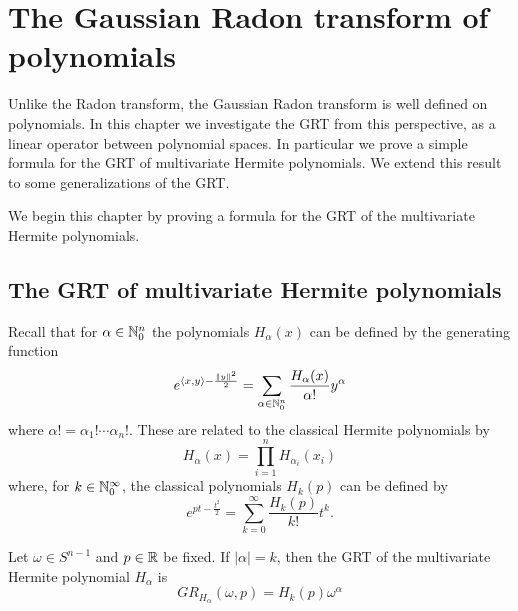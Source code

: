 \chapter{The Gaussian Radon transform of polynomials}{}
\label{chap:GRTpoly}

Unlike the Radon transform, the Gaussian Radon transform is well defined on polynomials. In this chapter we investigate the GRT from this perspective, as a linear operator between polynomial spaces. In particular we prove a simple formula for the GRT of multivariate Hermite polynomials. We extend this result to some generalizations of the GRT.

We begin this chapter by proving a formula for the GRT of the multivariate Hermite polynomials.

\section{The GRT of multivariate Hermite polynomials}


Recall that for $\alpha \in \mathbb{N}_0^n$ the polynomials $H_\alpha(x)$ can be defined by the generating function
\[
  e^{\langle x, y\rangle - \frac{\|y\|^2}2} = \sum_{\alpha \in \mathbb{N}_0^n} \frac{H_\alpha(x)}{\alpha!} y^\alpha
\]
where $\alpha! = \alpha_1! \cdots \alpha_n!$. These are related to the classical Hermite polynomials by
\[
  H_\alpha(x) = \prod_{i=1}^n H_{\alpha_i}(x_i)
\]
where, for $k \in \mathbb{N}_0^\infty$, the classical polynomials $H_{k}(p)$ can be defined by
\[
  e^{pt - \frac{t^2}2} = \sum_{k = 0}^\infty \frac{H_k(p)}{k!}t^k.
\]

\begin{proposition} \label{prop:GRTHermite}
  Let $\omega \in S^{n-1}$ and $p \in \mathbb{R}$ be fixed. If $|\alpha| = k$, then the GRT of the multivariate Hermite polynomial $H_\alpha$ is
  \begin{equation}\label{eq:GRH}
    GR_{H_\alpha}(\omega, p) = H_k(p)\omega^\alpha
  \end{equation}
\end{proposition}

